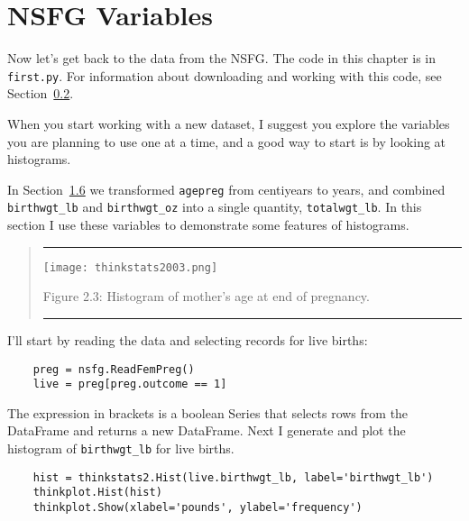 \documentclass[]{book}
\begin{document}
\hypertarget{nsfg-variables}{%
\section{NSFG Variables}\label{nsfg-variables}}

Now let's get back to the data from the
NSFG. The code in this chapter is in \texttt{first.py}. For information about
downloading and working with this code, see Section~\href{thinkstats2001.html\#code}{0.2}.

When you start working with a new
dataset, I suggest you explore the variables you are planning to use one
at a time, and a good way to start is by looking at histograms.

In Section~\href{thinkstats2002.html\#cleaning}{1.6} we transformed \texttt{agepreg} from centiyears to years,
and combined \texttt{birthwgt\_lb} and \texttt{birthwgt\_oz} into a single quantity,
\texttt{totalwgt\_lb}. In this section I use these variables to demonstrate some
features of histograms.

\begin{quote}
\begin{center}\rule{0.5\linewidth}{\linethickness}\end{center}

\texttt{[image: thinkstats2003.png]}

Figure 2.3: Histogram of mother's age at end of pregnancy.

\protect\hypertarget{first_agepreg_hist}{}{}

\begin{center}\rule{0.5\linewidth}{\linethickness}\end{center}
\end{quote}

I'll start by reading the data and selecting records for live births:

\begin{verbatim}
    preg = nsfg.ReadFemPreg()
    live = preg[preg.outcome == 1]
\end{verbatim}

The expression in brackets is a boolean
Series that selects rows from the DataFrame and returns a new DataFrame.
Next I generate and plot the histogram of \texttt{birthwgt\_lb} for live births.

\begin{verbatim}
    hist = thinkstats2.Hist(live.birthwgt_lb, label='birthwgt_lb')
    thinkplot.Hist(hist)
    thinkplot.Show(xlabel='pounds', ylabel='frequency')
\end{verbatim}
\end{document}

